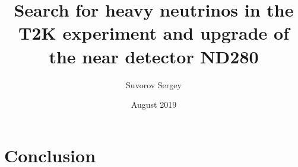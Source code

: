 \documentclass[12pt,a4paper]{memoir}
\title{Search for heavy neutrinos in the T2K experiment and upgrade of the near detector ND280}
\author{Suvorov Sergey}
\date{August 2019}
\begin{document}
\maketitle
\clearpage
\tableofcontents*






\part{Conclusion}
\end{document}
